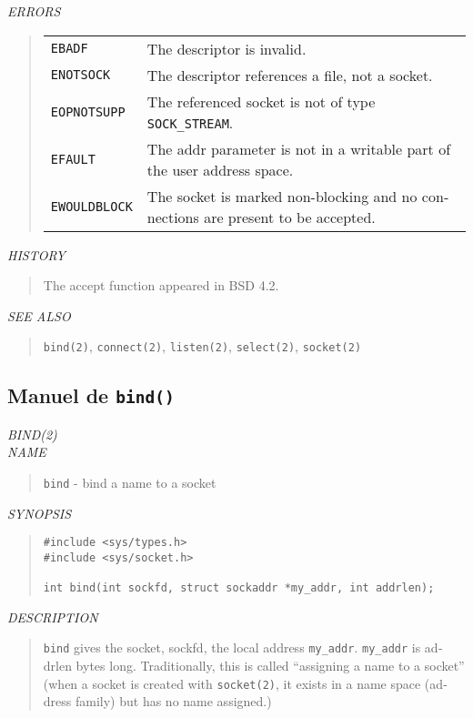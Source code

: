 \begin{appendix}
\begin{english}
{\sl ERRORS}
\begin{quote}
\begin{tabular}{lp{8cm}}
	{\tt EBADF}		&	The descriptor is invalid.\\
	{\tt ENOTSOCK}	&	The descriptor references a file, not a socket.\\
	{\tt EOPNOTSUPP}	&	The referenced socket is not of type {\tt SOCK\_STREAM}.\\
	{\tt EFAULT}		&	The addr parameter is not in a writable part of
							the user address space.\\
	{\tt EWOULDBLOCK}	&	The socket is marked non-blocking and no connections
							are present to be accepted.
\end{tabular}
\end{quote}

{\sl HISTORY}
\begin{quote}
 The accept function appeared in BSD 4.2.
\end{quote}

{\sl SEE ALSO}
\begin{quote}
	{\tt bind(2)}, {\tt connect(2)}, {\tt listen(2)}, {\tt select(2)},
	{\tt socket(2)}
\end{quote}
\end{english}

\subsection{Manuel de {\tt bind()}}
\begin{english}
{\sl BIND(2)}\\

{\sl NAME}
\begin{quote}
	{\tt bind} - bind a name to a socket
\end{quote}

{\sl SYNOPSIS}
\begin{quote}
\begin{verbatim}
#include <sys/types.h>
#include <sys/socket.h>

int bind(int sockfd, struct sockaddr *my_addr, int addrlen);
\end{verbatim}
\end{quote}

{\sl DESCRIPTION}
\begin{quote}
	{\tt bind} gives the socket, sockfd, the local address {\tt my\_addr}.
	{\tt my\_addr} is addrlen bytes long. Traditionally, this is
	called ``assigning a name to a socket'' (when a socket is
	created with {\tt socket(2)}, it exists in a name space (address
	family) but has no name assigned.)
\end{quote}


\end{english}
\end{appendix}
